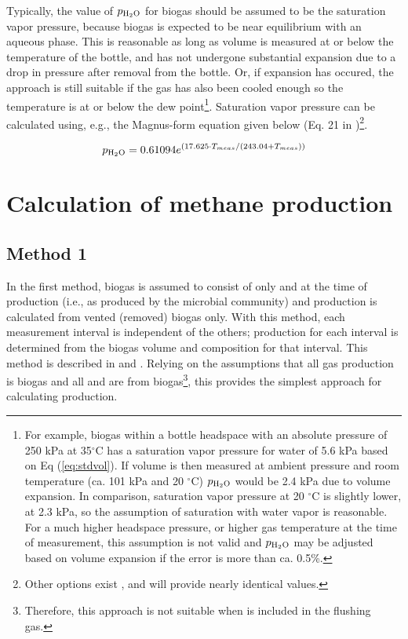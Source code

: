 \documentclass[]{article}
\begin{document}
Typically, the value of $p\textsubscript{H$_2$O}$ for biogas should be assumed to be the saturation vapor pressure, because biogas is expected to be near equilibrium with an aqueous phase.
This is reasonable as long as volume is measured at or below the temperature of the bottle, and has not undergone substantial expansion due to a drop in pressure after removal from the bottle.
Or, if expansion has occured, the approach is still suitable if the gas has also been cooled enough so the temperature is at or below the dew point\footnote{
  For example, biogas within a bottle headspace with an absolute pressure of 250 kPa at 35$^\circ$C has a saturation vapor pressure for water of 5.6 kPa based on Eq (\ref{eq:stdvol}).
  If volume is then measured at ambient pressure and room temperature (ca. 101 kPa and 20 $^\circ$C) $p\textsubscript{H$_2$O}$ would be 2.4 kPa due to volume expansion.
  In comparison, saturation vapor pressure at 20 $^\circ$C is slightly lower, at 2.3 kPa, so the assumption of saturation with water vapor is reasonable.
  For a much higher headspace pressure, or higher gas temperature at the time of measurement, this assumption is not valid and $p\textsubscript{H$_2$O}$ may be adjusted based on volume expansion if the error is more than ca. 0.5\%.
}.
Saturation vapor pressure can be calculated using, e.g., the Magnus-form equation given below (Eq. 21 in \citet{alduchovImprovedMagnusForm1996})\footnote{
  Other options exist \citep{richardsMethodsKineticanalysisMethane1991, vdiFermentationOrganicMaterials2016}, and will provide nearly identical values.
}.

\begin{equation}
\label{eq:magnus}
   p\textsubscript{H$_2$O} = 0.61094 e^{(17.625 \cdot T_{meas}/(243.04 + T_{meas}))}
\end{equation}

\section{Calculation of methane production}

\subsection{Method 1}
In the first method, biogas is assumed to consist of only  and  at the time of production (i.e., as produced by the microbial community) and  production is calculated from vented (removed) biogas only.
With this method, each measurement interval is independent of the others;  production for each interval is determined from the biogas volume and composition for that interval.
This method is described in \citet[Section 3]{richardsMethodsKineticanalysisMethane1991} and \citet[Eq. (7)]{vdiFermentationOrganicMaterials2016}.
Relying on the assumptions that all gas production is biogas and all  and  are from biogas\footnote{
  Therefore, this approach is not suitable when  is included in the flushing gas.
}, this provides the simplest approach for calculating  production.
\end{document}
